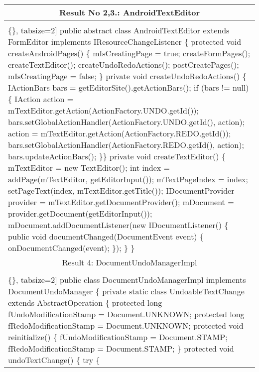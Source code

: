 \begin{figure*}[!htb]
 \begin{minipage}{1\textwidth}
\scriptsize 
\begin{tabular}{@{}p{}} 
 \hline 
    \multicolumn{1}{c}{Result No 2,3.: AndroidTextEditor} \\ \hline
  \vspace{-4mm}
\begin{Verbatim}[commandchars=\\\{\}, tabsize=2]
public abstract class AndroidTextEditor extends FormEditor implements IResourceChangeListener \{
 protected void createAndroidPages() \{
  mIsCreatingPage = true;
  createFormPages();
  createTextEditor();
  createUndoRedoActions();
  postCreatePages();
  mIsCreatingPage = false;
 \}
 private void createUndoRedoActions() \{
  IActionBars bars = getEditorSite().getActionBars();
  if (bars != null) \{
    IAction action = mTextEditor.getAction(ActionFactory.UNDO.getId());
    bars.setGlobalActionHandler(ActionFactory.UNDO.getId(), action);
    action = mTextEditor.getAction(ActionFactory.REDO.getId());
    bars.setGlobalActionHandler(ActionFactory.REDO.getId(), action);
    bars.updateActionBars();
  \}\}
 private void createTextEditor() \{
   mTextEditor = new TextEditor();
   int index = addPage(mTextEditor, getEditorInput());
   mTextPageIndex = index;
   setPageText(index, mTextEditor.getTitle());
   IDocumentProvider provider = mTextEditor.getDocumentProvider();
   mDocument = provider.getDocument(getEditorInput());
   mDocument.addDocumentListener(new IDocumentListener() \{
    public void documentChanged(DocumentEvent event) \{
    onDocumentChanged(event);
 \}); \} \}
\end{Verbatim}
\vspace{-4mm}
 \\ \hline
  \multicolumn{1}{c}{Result 4: DocumentUndoManagerImpl } \\ \hline
  \vspace{-4mm}
\begin{Verbatim}[commandchars=\\\{\}, tabsize=2]
public class DocumentUndoManagerImpl implements DocumentUndoManager \{
 private static class UndoableTextChange extends AbstractOperation \{
 protected long fUndoModificationStamp = Document.UNKNOWN;
 protected long fRedoModificationStamp = Document.UNKNOWN;
 protected void reinitialize() \{
   fUndoModificationStamp = Document.STAMP;
   fRedoModificationStamp = Document.STAMP;
  \}
 protected void undoTextChange() \{
  try \{

\end{Verbatim}
\end{tabular}
\end{minipage}
\end{figure*}
